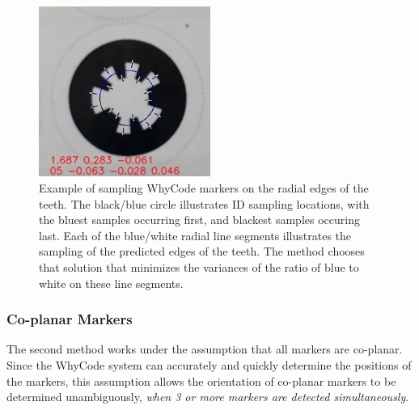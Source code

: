 \begin{figure}
    \centering
    \includegraphics[width=0.5\textwidth]{images/whycode_ellipse_sampling_example}
    \caption{Example of sampling WhyCode markers on the radial edges of the teeth.
    The black/blue circle illustrates ID sampling locations, with the bluest samples occurring first, and blackest samples occuring last.
    Each of the blue/white radial line segments illustrates the sampling of the predicted edges of the teeth.
    The method chooses that solution that minimizes the variances of the ratio of blue to white on these line segments.
    }
    \label{figure:ellipse_sampling}
\end{figure}

\subsubsection{Co-planar Markers}

The second method works under the assumption that all markers are co-planar.
Since the WhyCode system can accurately and quickly determine the positions of the markers,
this assumption allows the orientation of co-planar markers to be determined unambiguously,
\textit{when 3 or more markers are detected simultaneously}.